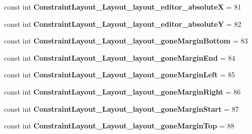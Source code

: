 \begin{DoxyCompactItemize}
const int {\bfseries Constraint\+Layout\+\_\+\+Layout\+\_\+layout\+\_\+editor\+\_\+absoluteX} = 81
\item 
\mbox{\label{classst_delivery_1_1_resource_1_1_styleable_a06b3c0ed80ddbb611d18630a6a63863e}} 
const int {\bfseries Constraint\+Layout\+\_\+\+Layout\+\_\+layout\+\_\+editor\+\_\+absoluteY} = 82
\item 
\mbox{\label{classst_delivery_1_1_resource_1_1_styleable_a5e4ada0d670c0af8e04e3e2c2ee0c5ff}} 
const int {\bfseries Constraint\+Layout\+\_\+\+Layout\+\_\+layout\+\_\+gone\+Margin\+Bottom} = 83
\item 
\mbox{\label{classst_delivery_1_1_resource_1_1_styleable_a7aefa0b1f6381ccd2c6a96fd0a3f9890}} 
const int {\bfseries Constraint\+Layout\+\_\+\+Layout\+\_\+layout\+\_\+gone\+Margin\+End} = 84
\item 
\mbox{\label{classst_delivery_1_1_resource_1_1_styleable_a9b797a7fe2085792ae3fca5c14c3caf8}} 
const int {\bfseries Constraint\+Layout\+\_\+\+Layout\+\_\+layout\+\_\+gone\+Margin\+Left} = 85
\item 
\mbox{\label{classst_delivery_1_1_resource_1_1_styleable_a19e58102056d01e8e62d51ff2b3d378c}} 
const int {\bfseries Constraint\+Layout\+\_\+\+Layout\+\_\+layout\+\_\+gone\+Margin\+Right} = 86
\item 
\mbox{\label{classst_delivery_1_1_resource_1_1_styleable_a92f811ea499816b5f00272ff49aad866}} 
const int {\bfseries Constraint\+Layout\+\_\+\+Layout\+\_\+layout\+\_\+gone\+Margin\+Start} = 87
\item 
\mbox{\label{classst_delivery_1_1_resource_1_1_styleable_a0720b05edabb0facd8d2f4781a57b5aa}} 
const int {\bfseries Constraint\+Layout\+\_\+\+Layout\+\_\+layout\+\_\+gone\+Margin\+Top} = 88
\item 
\mbox{\label{classst_delivery_1_1_resource_1_1_styleable_a6760267eafa6849a023f28121da551f3}} 

\end{DoxyCompactItemize}
